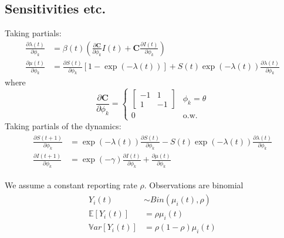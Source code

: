 \subsection{Sensitivities etc.}
Taking partials:
\begin{align*}
  \frac{\partial \lambda(t)}{\partial \phi_k} &= \beta(t) \left
  (\frac{\partial \mathbf{C}}{\partial \phi_k}I(t) + \mathbf{C}
  \frac{\partial I(t)}{\partial \phi_k} \right ) \\
  \frac{\partial \mu(t)}{\partial \phi_k} &= \frac{\partial
    S(t)}{\partial \phi_k} \left[1 - \exp(-\lambda(t))\right] + S(t)
  \exp(-\lambda(t)) \frac{\partial \lambda(t)}{\partial \phi_k}
\end{align*}
%
%
where
%
%
\begin{equation*}
\frac{\partial \mathbf{C}}{\partial \phi_k} = \begin{cases}
\begin{bmatrix} -1 & 1 \\ 1 & -1 \end{bmatrix} & \phi_k = \theta \\
0 &  \text{o.w.}
\end{cases}
\end{equation*}
%
%
Taking partials of the dynamics:
%
%
\begin{align}\begin{split}
    \frac{\partial S(t+1)}{\partial \phi_k}
    &= \exp(-\lambda(t)) \frac{\partial S(t)}{\partial \phi_k} -
    S(t) \exp(-\lambda(t)) \frac{\partial \lambda(t)}{\partial
      \phi_k} \\
    \frac{\partial I(t+1)}{\partial \phi_k} &= \exp(-\gamma)
    \frac{\partial I(t)}{\partial \phi_k} + \frac{\partial
      \mu(t)}{\partial \phi_k}
\end{split}\end{align}


We assume a constant reporting rate $\rho$. Observations are binomial
\begin{align}\begin{split}
Y_i(t) &\sim Bin(\mu_i(t), \rho) \\
\mathbb{E}[Y_i(t)] &= \rho \mu_i(t) \\
\mathbb{V}ar[Y_i(t)] &= \rho(1-\rho) \mu_i(t) \\
\end{split}\end{align}


